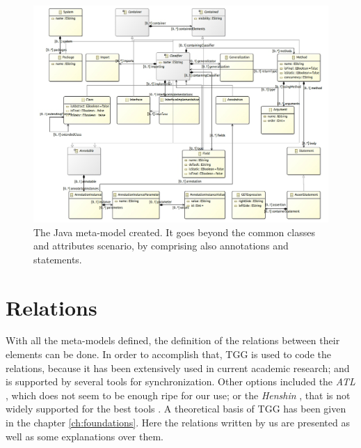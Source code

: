 \documentclass[tuberlin,cic,tc,english,noabntcite]{iiufrgs}
\begin{document}
\begin{figure}[h]
    \caption{The Java meta-model created. It goes beyond the common classes and attributes scenario, by comprising also annotations and statements.}
    \begin{center}
        \includegraphics[width=40em]{java_metamodel}
    \end{center}
    \label{fig:java_metamodel}
\end{figure}

\section{Relations}
With all the meta-models defined, the definition of the relations between their elements can be done. In order to accomplish that, TGG is used to code the relations, because it has been extensively used in current academic research; and is supported by several tools for synchronization. Other options included the \emph{ATL} \citep{jouault2008atl}, which does not seem to be enough ripe for our use; or the \emph{Henshin} \citep{arendt2010henshin}, that is not widely supported for the best tools \citep{hildebrandt2013survey}. A theoretical basis of TGG has been given in the chapter \ref{ch:foundations}. Here the relations written by us are presented as well as some explanations over them.

\end{document}
